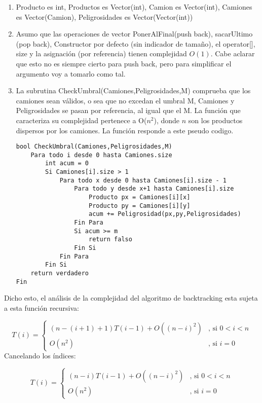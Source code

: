 \begin{enumerate}

\item Producto es int, Productos es Vector(int), Camion es Vector(int), Camiones es Vector(Camion), Peligrosidades es Vector(Vector(int))
\item Asumo que las operaciones de vector PonerAlFinal(push back), sacarUltimo (pop back), Constructor por defecto (sin indicador de tamaño), el operator[], size y la asignación (por referencia) tienen complejidad $O(1)$. Cabe aclarar que esto no es siempre cierto para push back, pero para simplificar el argumento voy a tomarlo como tal.
\item La subrutina CheckUmbral(Camiones,Peligrosidades,M) comprueba que los camiones sean válidos, o sea que no excedan el umbral M, Camiones y Peligrosidades se pasan por referencia, al igual que el M. La función que caracteriza su complejidad pertenece a O($n^2$), donde $n$ son los productos dispersos por los camiones. La función responde a este pseudo codigo.
\bigskip
\begin{lstlisting}
bool CheckUmbral(Camiones,Peligrosidades,M)
	Para todo i desde 0 hasta Camiones.size
		int acum = 0
		Si Camiones[i].size > 1
			Para todo x desde 0 hasta Camiones[i].size - 1
				Para todo y desde x+1 hasta Camiones[i].size
					Producto px = Camiones[i][x]
					Producto py = Camiones[i][y]
					acum += Peligrosidad(px,py,Peligrosidades)
				Fin Para
				Si acum >= m
					return falso
				Fin Si
			Fin Para
		Fin Si
	return verdadero
Fin
\end{lstlisting}

\end{enumerate}

Dicho esto, el análisis de la complejidad del algoritmo de backtracking esta sujeta a esta función recursiva:

\[ T(i) = \left\{ \begin{array}{ll}
         (n-(i+1)+1)T(i-1) + O((n-i)^2) & \mbox{, si $0 < i < n$}\\
         O(n^2) & \mbox{, si $i = 0$}\end{array} \right. \]
Cancelando los índices:

\[ T(i) = \left\{ \begin{array}{ll}
         (n-i)T(i-1) + O((n-i)^2) & \mbox{, si $0 < i < n$}\\
         O(n^2) & \mbox{, si $i = 0$}\end{array} \right. \]       

